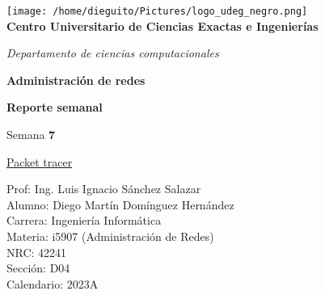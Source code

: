\begin{center}
	\texttt{[image: /home/dieguito/Pictures/logo\_udeg\_negro.png]}\\
	\vspace{1cm}
{\Large 	\textbf{Centro Universitario de Ciencias Exactas e Ingenierías}\\}

\vspace{0.5cm}
	
{\large 	\textit{Departamento de ciencias computacionales}\\}
	
	\vspace{1cm}
	
	\textbf{Administración de redes}\\
	
	\vspace{0.5cm}
	
	\textbf{Reporte semanal}\\
	
	\vspace{0.5cm}
	
	Semana \textbf{7}
	
	\vspace{0.5cm}
	
	\underline{Packet tracer}\\
	
	\vspace{1cm}
	
	Prof: Ing. Luis Ignacio Sánchez Salazar\\
	
	Alumno: Diego Martín Domínguez Hernández\\
	
	Carrera: Ingeniería Informática \\
	
	Materia: i5907 (Administración de Redes)\\
	
	NRC: 42241\\
	
	Sección: D04\\

	Calendario: 2023A\\
	
\end{center}
\newpage

